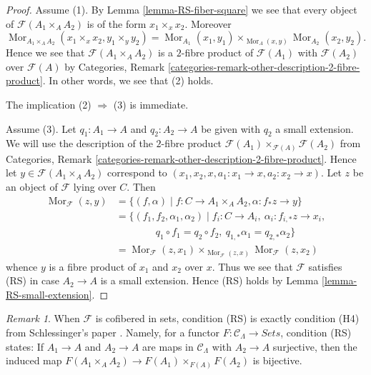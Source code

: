 \documentclass{stacks-project}
\theoremstyle{plain}
\theoremstyle{definition}
\theoremstyle{remark}
\newtheorem{remark}[subsection]{Remark}
\numberwithin{equation}{subsection}
\def\Mor{\mathop{\mathrm{Mor}}\nolimits}
\begin{document}
\begin{proof}
Assume (1). By
Lemma \ref{lemma-RS-fiber-square}
we see that every object of $\mathcal{F}(A_1 \times_A A_2)$
is of the form $x_1 \times_x x_2$. Moreover
$$
\Mor_{A_1 \times_A A_2}(x_1 \times_x x_2, y_1 \times_y y_2) =
\Mor_{A_1}(x_1, y_1) \times_{\Mor_A(x, y)}
\Mor_{A_2}(x_2, y_2).
$$
Hence we see that $\mathcal{F}(A_1 \times_A A_2)$ is a $2$-fibre product
of $\mathcal{F}(A_1)$ with $\mathcal{F}(A_2)$ over $\mathcal{F}(A)$ by
Categories, Remark \ref{categories-remark-other-description-2-fibre-product}.
In other words, we see that (2) holds.

\medskip\noindent
The implication (2) $\Rightarrow$ (3) is immediate.

\medskip\noindent
Assume (3). Let $q_1 : A_1 \to A$ and $q_2 : A_2 \to A$ be given with
$q_2$ a small extension. We will use the description of the $2$-fibre product
$\mathcal{F}(A_1) \times_{\mathcal{F}(A)} \mathcal{F}(A_2)$ from
Categories, Remark \ref{categories-remark-other-description-2-fibre-product}.
Hence let $y \in \mathcal{F}(A_1 \times_A A_2)$ correspond to
$(x_1, x_2, x, a_1 : x_1 \to x, a_2 : x_2 \to x)$.
Let $z$ be an object of $\mathcal{F}$ lying over $C$. Then
\begin{align*}
\Mor_\mathcal{F}(z, y) & =
\{(f, \alpha) \mid f : C \to A_1 \times_A A_2,
\alpha : f_*z \to y\} \\
& = \{(f_1, f_2, \alpha_1, \alpha_2) \mid
f_i : C \to A_i, \ \alpha_i : f_{i, *}z \to x_i, \\
& \quad\quad\quad\quad
q_1 \circ f_1 = q_2 \circ f_2, \ q_{1, *} \alpha_1 = q_{2, *}\alpha_2\} \\
& =
\Mor_\mathcal{F}(z, x_1) \times_{\Mor_\mathcal{F}(z, x)}
\Mor_\mathcal{F}(z, x_2)
\end{align*}
whence $y$ is a fibre product of $x_1$ and $x_2$ over $x$. Thus we see
that $\mathcal{F}$ satisfies (RS) in case $A_2 \to A$ is a small extension.
Hence (RS) holds by
Lemma \ref{lemma-RS-small-extension}.
\end{proof}

\begin{remark}
\label{remark-compare-schlessinger-H4}
When $\mathcal{F}$ is cofibered in sets, condition (RS) is exactly condition
(H4) from Schlessinger's paper \cite[Theorem 2.11]{Sch}.  Namely, for
a functor $F: \mathcal{C}_\Lambda \to \textit{Sets}$, condition
(RS) states: If $A_1 \to A$ and $A_2 \to A$ are maps in
$\mathcal{C}_\Lambda$ with $A_2 \to A$ surjective, then the induced
map $F(A_1 \times_A A_2) \to F(A_1) \times_{F(A)} F(A_2)$ is
bijective.
\end{remark}
\end{document}
